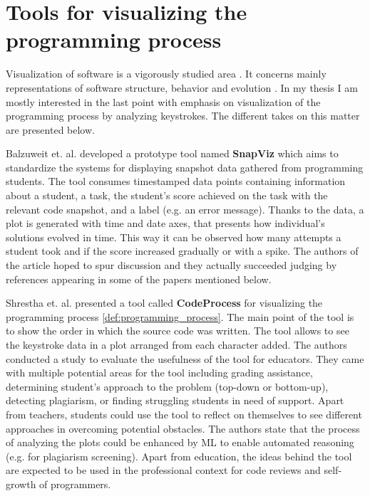 \section{Tools for visualizing the programming process}

Visualization of software is a vigorously studied area \cite{Mat16SoftwareVisualizationReview, Nov13SEV}. It concerns mainly representations of software structure, behavior and evolution \cite{DieSoftViz}. In my thesis I am mostly interested in the last point with emphasis on visualization of the programming process by analyzing keystrokes. The different takes on this matter are presented below.

Balzuweit et. al. \cite{Bal13SnapViz} developed a prototype tool named \textbf{SnapViz} which aims to standardize the systems for displaying snapshot data gathered from programming students. The tool consumes timestamped data points containing information about a student, a task, the student's score achieved on the task with the relevant code snapshot, and a label (e.g. an error message). Thanks to the data, a plot is generated with time and date axes, that presents how individual's solutions evolved in time. This way it can be observed how many attempts a student took and if the score increased gradually or with a spike. The authors of the article hoped to spur discussion and they actually succeeded judging by references appearing in some of the papers mentioned below.

Shrestha et. al. \cite{Shr22CodeProcess} presented a tool called \textbf{CodeProcess} for visualizing the programming process \ref{def:programming_process}. The main point of the tool is to show the order in which the source code was written. The tool allows to see the keystroke data in a plot arranged from each character added. The authors conducted a study to evaluate the usefulness of the tool for educators. They came with multiple potential areas for the tool including grading assistance, determining student's approach to the problem (top-down or bottom-up), detecting plagiarism, or finding struggling students in need of support. Apart from teachers, students could use the tool to reflect on themselves to see different approaches in overcoming potential obstacles. The authors state that the process of analyzing the plots could be enhanced by ML to enable automated reasoning (e.g. for plagiarism screening). Apart from education, the ideas behind the tool are expected to be used in the professional context for code reviews and self-growth of programmers.

